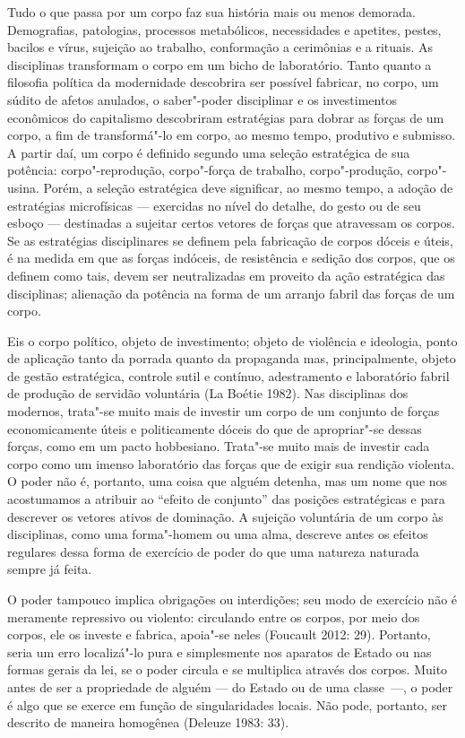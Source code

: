 Tudo o que passa por um
corpo faz sua história mais ou menos demorada. Demografias, patologias,
processos metabólicos, necessidades e apetites, pestes, bacilos e vírus,
sujeição ao trabalho, conformação a cerimônias e a rituais. As
disciplinas transformam o corpo em um bicho de laboratório. Tanto quanto
a filosofia política da modernidade descobrira ser possível fabricar, no
corpo, um súdito de afetos anulados, o saber"-poder disciplinar e os
investimentos econômicos do capitalismo descobriram estratégias para
dobrar as forças de um corpo, a fim de transformá"-lo em corpo, ao mesmo
tempo, produtivo e submisso. A partir daí, um corpo é definido segundo
uma seleção estratégica de sua potência: corpo"-reprodução, corpo"-força
de trabalho, corpo"-produção, corpo"-usina. Porém, a seleção estratégica
deve significar, ao mesmo tempo, a adoção de estratégias microfísicas ---
exercidas no nível do detalhe, do gesto ou de seu esboço --- destinadas a
sujeitar certos vetores de forças que atravessam os corpos. Se as
estratégias disciplinares se definem pela fabricação de corpos dóceis e
úteis, é na medida em que as forças indóceis, de resistência e sedição
dos corpos, que os definem como tais, devem ser neutralizadas em
proveito da ação estratégica das disciplinas; alienação da potência na
forma de um arranjo fabril das forças de um corpo.

Eis o corpo político, objeto de investimento; objeto de violência e
ideologia, ponto de aplicação tanto da porrada quanto da propaganda mas,
principalmente, objeto de gestão estratégica, controle sutil e contínuo,
adestramento e laboratório fabril de produção de servidão voluntária (La
Boétie 1982). Nas disciplinas dos modernos, trata"-se muito mais de
investir um corpo de um conjunto de forças economicamente úteis e
politicamente dóceis do que de apropriar"-se dessas forças, como em um
pacto hobbesiano. Trata"-se muito mais de investir cada corpo como um
imenso laboratório das forças que de exigir sua rendição violenta. O
poder não é, portanto, uma coisa que alguém detenha, mas um nome que nos
acostumamos a atribuir ao ``efeito de conjunto'' das posições
estratégicas e para descrever os vetores ativos de dominação. A sujeição
voluntária de um corpo às disciplinas, como uma forma"-homem ou uma alma,
descreve antes os efeitos regulares dessa forma de exercício de poder do
que uma natureza naturada sempre já feita.

O poder tampouco implica obrigações ou interdições; seu modo de
exercício não é meramente repressivo ou violento: circulando entre os
corpos, por meio dos corpos, ele os investe e fabrica, apoia"-se neles
(Foucault 2012: 29). Portanto, seria um erro localizá"-lo pura e
simplesmente nos aparatos de Estado ou nas formas gerais da lei, se o
poder circula e se multiplica através dos corpos. Muito antes de ser a
propriedade de alguém --- do Estado ou de uma classe~---, o poder é algo
que se exerce em função de singularidades locais. Não pode, portanto,
ser descrito de maneira homogênea (Deleuze 1983: 33).

